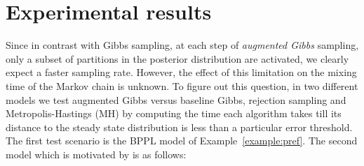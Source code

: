 \section{Experimental results}
\label{sect:experiment}

Since in contrast with Gibbs sampling, at each step of \emph{augmented Gibbs} sampling, 
only a subset of partitions in the posterior distribution are activated, we clearly expect a faster sampling rate.
However, the effect of this limitation on the mixing time of the Markov chain is unknown.   
To figure out this question, in two different models we test augmented Gibbs versus baseline Gibbs, rejection sampling and Metropolis-Hastings (MH) by computing the time each algorithm takes till its distance to  the steady state distribution is less than a particular error threshold.
The first test scenario is the BPPL model of Example~\ref{example:pref}.
The second model which is motivated by \cite{Das:08} is as follows:

